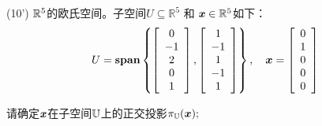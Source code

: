 \documentclass[12pt,a4paper,openany,twoside]{ctexbook}
\begin{document}
\begin{exercise}(10')
	$ \mathbb{R}^5 $的欧氏空间。子空间$U \subseteq \mathbb{R}^{5}$ 和 $\boldsymbol{\mathit{x}}  \in \mathbb{R}^{5}$如下：
	\[
	U=\mathop{\bf span}\nolimits \left\{ \left[\begin{array}{c}{0} \\ {-1} \\ {2} \\ {0} \\ {1}\end{array}\right],\left[\begin{array}{c}{1} \\ {-1} \\ {1} \\ {-1} \\ {1}\end{array}\right]
	\right\}, \quad \boldsymbol{x}=\left[\begin{array}{c}{0} \\ {1} \\ {0} \\ {0} \\ {0}\end{array}\right]
	\]
	
	请确定$ \boldsymbol{\mathit{x}}  $在子空间$ \mathbb{U} $上的正交投影$ \pi_{\mathbb{U}}(\boldsymbol{x}) ;$
	
\end{exercise}
%
\end{document}
